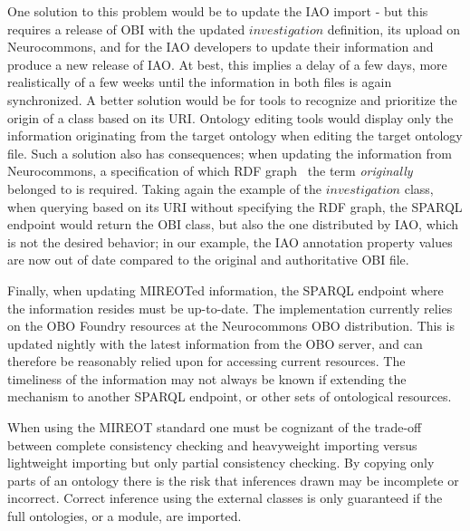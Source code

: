 \documentclass[jou]{ao2e}%
\begin{document}
One solution to this problem would be to update the \ac{IAO} import - but this requires a release of \ac{OBI} with the updated $investigation$ definition, its upload on Neurocommons, and for the \ac{IAO} developers to update their information and produce a new release of \ac{IAO}. At best, this implies a delay of a few days, more realistically of a few weeks until the information in both files is again synchronized.
A better solution would be for tools to recognize and prioritize the origin of a class based on its URI. Ontology editing tools would display only the information originating from the target ontology when editing the target ontology file.
Such a solution also has consequences; when updating the information from Neurocommons, a specification of which \ac{RDF} graph~\citep{RDF} the term \emph{originally} belonged to is required. Taking again the example of the $investigation$ class, when querying based on its URI without specifying the RDF graph, the SPARQL endpoint would return the \ac{OBI} class, but also the one distributed by \ac{IAO}, which is not the desired behavior; in our example, the \ac{IAO} annotation property values are now out of date compared to the original and authoritative \ac{OBI} file. %

Finally, when updating MIREOTed information, the SPARQL endpoint where the information resides must be up-to-date. The implementation currently relies on the \ac{OBO} Foundry resources at the Neurocommons \ac{OBO} distribution. This is updated nightly with the latest information from the \ac{OBO} server, and can therefore be reasonably relied upon for accessing current resources. The timeliness of the information may not always be known if extending the mechanism to another SPARQL endpoint, or other sets of ontological resources.

When using the \ac{MIREOT} standard one must be cognizant of the trade-off between complete consistency checking and heavyweight importing versus lightweight importing but only partial consistency checking.
By copying only parts of an ontology there is the risk that inferences drawn may be incomplete or incorrect. 
Correct inference using the external classes is only guaranteed if the full ontologies, or a module, are imported.
\end{document}

